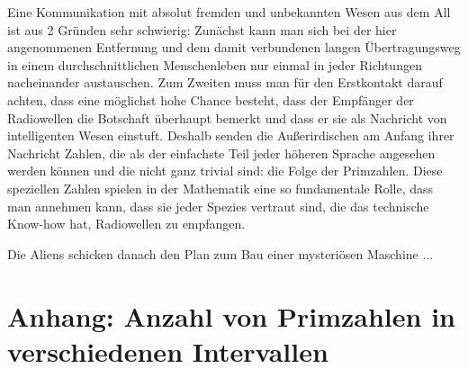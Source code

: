 \begin{refsegment}
Eine Kommunikation mit absolut fremden und unbekannten Wesen aus dem All ist
aus 2 Gründen sehr schwierig:
Zunächst kann man sich bei der hier angenommenen Entfernung und dem damit
verbundenen langen Übertragungsweg in einem durchschnittlichen Menschenleben
nur einmal in jeder Richtungen nacheinander austauschen.
Zum Zweiten muss man für den Erstkontakt darauf achten, dass eine möglichst
hohe Chance besteht, dass der Empfänger der Radiowellen die Botschaft überhaupt
bemerkt und dass er sie als Nachricht von intelligenten Wesen einstuft.
Deshalb senden die Außerirdischen am Anfang ihrer Nachricht Zahlen, die als
der einfachste Teil jeder höheren Sprache angesehen werden können  und die nicht
ganz trivial sind: die Folge der Primzahlen. Diese speziellen Zahlen spielen in der
Mathematik eine so fundamentale Rolle, dass man annehmen kann, dass sie jeder
Spezies vertraut sind, die das technische Know-how hat, Radiowellen zu
empfangen.

Die Aliens schicken danach den Plan zum Bau einer mysteriösen Maschine ...



\hypertarget{primhfk}{}
\section{Anhang: Anzahl von Primzahlen in verschiedenen Intervallen}
\label{s:primhfk}


\end{refsegment}
